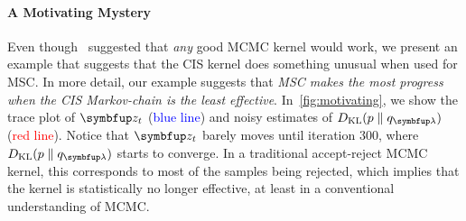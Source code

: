 
\vspace{-0.1in}
\paragraph{A Motivating Mystery}
Even though~\citeauthor{NEURIPS2020_b2070693} suggested that \textit{any} good MCMC kernel would work, we present an example that suggests that the CIS kernel does something unusual when used for MSC.
In more detail, our example suggests that \textit{MSC makes the most progress when the CIS Markov-chain is the least effective}.
In~\cref{fig:motivating}, we show the trace plot of \(\vz_t\) (\textcolor{blue}{blue line}) and noisy estimates of \(\DKL{p}{q_{\vlambda}}\) (\textcolor{red}{red line}).
Notice that \(\vz_t\) barely moves until iteration 300, where \(\DKL{p}{q_{\vlambda}}\) starts to converge.
In a traditional accept-reject MCMC kernel, this corresponds to most of the samples being rejected, which implies that the kernel is statistically no longer effective, at least in a conventional understanding of MCMC.


%

